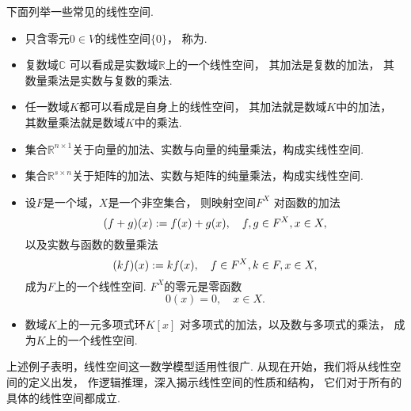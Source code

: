 \begin{example}
下面列举一些常见的线性空间.
\begin{itemize}
	\item 只含零元\(0 \in V\)的线性空间\(\{0\}\)，
	称为.

	\item 复数域\(\mathbb{C}\)
	可以看成是实数域\(\mathbb{R}\)上的一个线性空间，
	其加法是复数的加法，
	其数量乘法是实数与复数的乘法.

	\item 任一数域\(K\)都可以看成是自身上的线性空间，
	其加法就是数域\(K\)中的加法，
	其数量乘法就是数域\(K\)中的乘法.

	\item 集合\(\mathbb{R}^{n \times 1}\)关于向量的加法、实数与向量的纯量乘法，构成实线性空间.

	\item 集合\(\mathbb{R}^{s \times n}\)关于矩阵的加法、实数与矩阵的纯量乘法，构成实线性空间.

	\item 设\(F\)是一个域，\(X\)是一个非空集合，
	则映射空间\(F^X\)
	对函数的加法\begin{equation*}
		(f+g)(x) := f(x) + g(x),
		\quad f,g \in F^X, x \in X,
	\end{equation*}
	以及实数与函数的数量乘法\begin{equation*}
		(k f)(x) := k f(x),
		\quad f \in F^X, k \in F, x \in X,
	\end{equation*}
	成为\(F\)上的一个线性空间.
	\(F^X\)的零元是零函数\begin{equation*}
		0(x) = 0,
		\quad x \in X.
	\end{equation*}

	\item 数域\(K\)上的一元多项式环\(K[x]\)
	对多项式的加法，以及数与多项式的乘法，
	成为\(K\)上的一个线性空间.
\end{itemize}
\end{example}

上述例子表明，线性空间这一数学模型适用性很广.
从现在开始，我们将从线性空间的定义出发，
作逻辑推理，深入揭示线性空间的性质和结构，
它们对于所有的具体的线性空间都成立.

